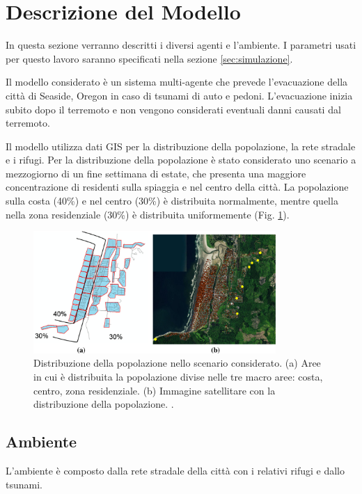 \section{Descrizione del Modello}
\label{sec:modello}
In questa sezione verranno descritti i diversi agenti e l'ambiente.
I parametri usati per questo lavoro saranno specificati nella sezione \ref{sec:simulazione}.

Il modello considerato \parencite{mostafizi2016agent} è un sistema multi-agente che prevede l'evacuazione della città di Seaside, Oregon in caso di tsunami di auto e pedoni.
%
L'evacuazione inizia subito dopo il terremoto e non vengono considerati eventuali danni causati dal terremoto.

\pagebreak

Il modello utilizza dati GIS per la distribuzione della popolazione, la rete stradale e i rifugi.
%
Per la distribuzione della popolazione è stato considerato uno scenario a mezzogiorno di un fine settimana di estate,
che presenta una maggiore concentrazione di residenti sulla spiaggia e nel centro della città.
La popolazione sulla costa (40\%) e nel centro (30\%) è distribuita normalmente,
mentre quella nella zona residenziale (30\%) è distribuita uniformemente (Fig. \ref{fig:population}).

\begin{figure}[ht]
  \centering
  \includegraphics[width=0.82\textwidth]{images/population}
  \caption{Distribuzione della popolazione nello scenario considerato.
    (a) Aree in cui è distribuita la popolazione divise nelle tre macro aree: costa, centro, zona residenziale.
    (b) Immagine satellitare con la distribuzione della popolazione.
    \parencite{mostafizi2017agent}.}
  \label{fig:population}
\end{figure}

\subsection{Ambiente}
L'ambiente è composto dalla rete stradale della città con i relativi rifugi e dallo tsunami.

